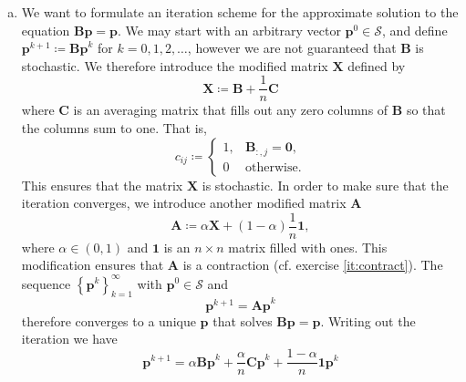 \documentclass[12pt, oneside, article, a4paper]{memoir}
\newcommand{\mat}[1]{\bm{#1}}
\begin{document}
\begin{enumerate}[a)]
    \item We want to formulate an iteration scheme for the approximate solution
        to the equation \( \mat{Bp} = \mat{p} \). We may start with an
        arbitrary vector \( \mat{p}^0 \in \mathcal{S} \), and define \(
        \mat{p}^{k+1}  \coloneqq \mat{Bp}^k \) for \( k = 0, 1, 2, \ldots \),
        however we are not guaranteed that \( \mat{B} \) is stochastic.
        We therefore introduce the modified matrix \( \mat{X} \) defined by
        \begin{equation}
            \mat{X} \coloneqq \mat{B} + \frac{1}{n} \mat{C}
        \end{equation}
        where \( \mat{C} \) is an averaging matrix that fills out any zero
        columns of \( \mat{B} \) so that the columns sum to one. That is,
        \begin{equation}
            c_{ij} \coloneqq \begin{cases}
                1, & \mat{B}_{:, j} = \mat{0},\\
                0 & \text{otherwise}.
            \end{cases}
        \end{equation}
        This ensures that the matrix \( \mat{X} \) is stochastic. In order to
        make sure that the iteration converges, we introduce another modified
        matrix \( \mat{A} \)
        \begin{equation}
            \mat{A} \coloneqq \alpha \mat{X} + (1 - \alpha) \frac{1}{n} \mat{1},
        \end{equation}
        where \( \alpha \in (0, 1)\) and \( \mat{1} \) is an \( n\times n\)
        matrix filled with ones. This modification ensures that \( \mat{A} \)
        is a contraction (cf. exercise \vref{it:contract}).  The sequence \(
        \left\{ \mat{p}^k \right\}_{k=1}^\infty \) with \( \mat{p}^0 \in
        \mathcal{S} \) and
        \begin{equation}
            \mat{p}^{k+1} = \mat{Ap}^k
        \end{equation}
        therefore converges to a unique \( \mat{p} \) that solves \( \mat{Bp} =
        \mat{p} \).  Writing out the iteration we have
        \begin{equation}
            \mat{p}^{k+1} = \alpha \mat{Bp}^k  + \frac{\alpha}{n} \mat{Cp}^k +
            \frac{1 - \alpha}{n} \mat{1p}^k
        \end{equation}
    

\end{enumerate}
\end{document}
